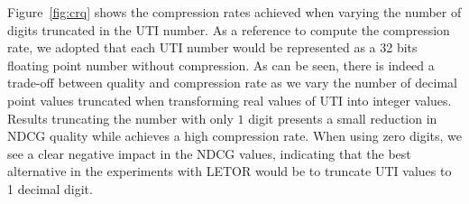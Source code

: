 \documentclass[preprint,review,10pt,3p]{elsarticle}
\begin{document}
Figure~\ref{fig:crq} shows the compression rates achieved when varying
the number of digits truncated in the UTI number. As a reference to
compute the compression rate, we adopted that each UTI number would be
represented as a 32 bits floating point number without compression. As
can be seen, there is indeed a trade-off between quality and
compression rate as we vary the number of decimal point values
truncated when transforming real values of UTI into integer values.
Results truncating the number with only $1$ digit presents a small
reduction in NDCG quality while achieves a high compression rate. When
using zero digits, we see a clear negative impact in the NDCG values,
indicating that the best alternative in the experiments with LETOR
would be to truncate UTI values to 1 decimal digit.


















%



\end{document}
